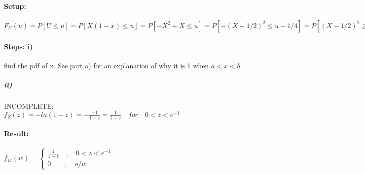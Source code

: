 \paragraph{Setup:} ${ F }_{ U }(u)=P[U\le u]=P[X(1-x)\le u]=P[-{X}^{2}+X \le u]=P[-(X-1/2)^{2}\le u-1/4]= P[(X-1/2)^{2}\ge 1/4-u]== P[\left|(X-1/2) \right| \ge (1/4-u)^{1/2} ]= $

\paragraph{Steps: i)} find the pdf of x. See part a) for an explanation of why it is 1 when $a<x<b$


\subparagraph{ii)}INCOMPLETE:\\ ${ f }_{ Z }(z)= -ln(1-z)=-\frac { -1 }{1-z}=\frac{1}{1-z} \quad for \quad 0<z<{e}^{-1}$

\paragraph{Result:} ${ f }_{ W }(w)=\begin{cases} \frac{ 1 }{1-z} \quad ,\quad 0<z<{e}^{-1} \\ 0\quad  \quad ,\quad o/w \end{cases}$

